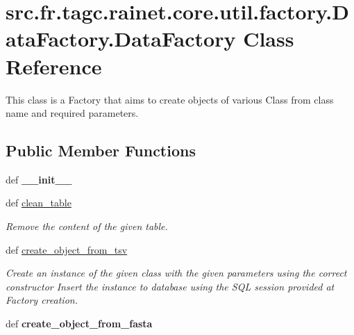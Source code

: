 \hypertarget{classsrc_1_1fr_1_1tagc_1_1rainet_1_1core_1_1util_1_1factory_1_1DataFactory_1_1DataFactory}{\section{src.\-fr.\-tagc.\-rainet.\-core.\-util.\-factory.\-Data\-Factory.\-Data\-Factory Class Reference}
\label{classsrc_1_1fr_1_1tagc_1_1rainet_1_1core_1_1util_1_1factory_1_1DataFactory_1_1DataFactory}
}


This class is a Factory that aims to create objects of various Class from class name and required parameters.  


\subsection*{Public Member Functions}
\begin{DoxyCompactItemize}
\item 
\hypertarget{classsrc_1_1fr_1_1tagc_1_1rainet_1_1core_1_1util_1_1factory_1_1DataFactory_1_1DataFactory_a7f7fc28351f88b2e831eb67cf63cb3a9}{def {\bfseries \-\_\-\-\_\-init\-\_\-\-\_\-}}\label{classsrc_1_1fr_1_1tagc_1_1rainet_1_1core_1_1util_1_1factory_1_1DataFactory_1_1DataFactory_a7f7fc28351f88b2e831eb67cf63cb3a9}

\item 
\hypertarget{classsrc_1_1fr_1_1tagc_1_1rainet_1_1core_1_1util_1_1factory_1_1DataFactory_1_1DataFactory_a1768d12461502c1a45de649c00bb6f61}{def \hyperlink{classsrc_1_1fr_1_1tagc_1_1rainet_1_1core_1_1util_1_1factory_1_1DataFactory_1_1DataFactory_a1768d12461502c1a45de649c00bb6f61}{clean\-\_\-table}}\label{classsrc_1_1fr_1_1tagc_1_1rainet_1_1core_1_1util_1_1factory_1_1DataFactory_1_1DataFactory_a1768d12461502c1a45de649c00bb6f61}

\begin{DoxyCompactList}\small\item\em Remove the content of the given table. \end{DoxyCompactList}\item 
def \hyperlink{classsrc_1_1fr_1_1tagc_1_1rainet_1_1core_1_1util_1_1factory_1_1DataFactory_1_1DataFactory_ab8f8da36aace01b8729585a7e4e5622a}{create\-\_\-object\-\_\-from\-\_\-tsv}
\begin{DoxyCompactList}\small\item\em Create an instance of the given class with the given parameters using the correct constructor Insert the instance to database using the S\-Q\-L session provided at Factory creation. \end{DoxyCompactList}\item 
\hypertarget{classsrc_1_1fr_1_1tagc_1_1rainet_1_1core_1_1util_1_1factory_1_1DataFactory_1_1DataFactory_a166db7f68a223633ef3a3caa38f1e25c}{def {\bfseries create\-\_\-object\-\_\-from\-\_\-fasta}}\label{classsrc_1_1fr_1_1tagc_1_1rainet_1_1core_1_1util_1_1factory_1_1DataFactory_1_1DataFactory_a166db7f68a223633ef3a3caa38f1e25c}

\end{DoxyCompactItemize}
